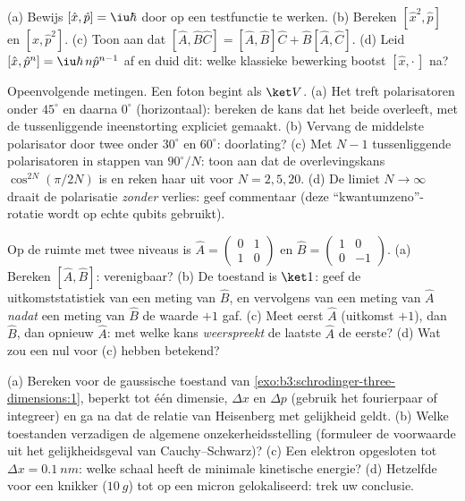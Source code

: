 \begin{exercise}[$\star$]\label{exo:b3:quantum-formalism:4}
(a) Bewijs $[\hat x, \hat p] = \iu\hbar$ door op een testfunctie te werken.
(b) Bereken $[\hat x^2, \hat p]$ en $[\hat x, \hat p^2]$. (c) Toon aan dat
$[\hat A, \hat B\hat C] = [\hat A, \hat B]\hat C + \hat B[\hat A,
\hat C]$. (d) Leid $[\hat x, \hat p^n] = \iu\hbar\,n\hat p^{n-1}$ af en
duid dit: welke klassieke bewerking bootst $[\hat x, \cdot\,]$ na?
\end{exercise}

\begin{exercise}[$\star\star$]\label{exo:b3:quantum-formalism:5}
Opeenvolgende metingen. Een foton begint als $\ket V$. (a) Het treft
polarisatoren onder $45^\circ$ en daarna $0^\circ$ (horizontaal): bereken
de kans dat het beide overleeft, met de tussenliggende ineenstorting
expliciet gemaakt. (b) Vervang de middelste polarisator door twee onder
$30^\circ$ en $60^\circ$: doorlating? (c) Met $N - 1$ tussenliggende
polarisatoren in stappen van $90^\circ/N$: toon aan dat de
overlevingskans $\cos^{2N}(\pi/2N)$ is en reken haar uit voor $N = 2, 5, 20$. (d) De limiet $N \to \infty$ draait de polarisatie \emph{zonder}
verlies: geef commentaar (deze ``kwantumzeno''-rotatie wordt op echte
qubits gebruikt).
\end{exercise}

\begin{exercise}[$\star\star$]\label{exo:b3:quantum-formalism:6}
Op de ruimte met twee niveaus is $\hat A = \begin{pmatrix}0&1\\1&0
\end{pmatrix}$ en $\hat B = \begin{pmatrix}1&0\\0&-1\end{pmatrix}$.
(a) Bereken $[\hat A, \hat B]$: verenigbaar? (b) De toestand is $\ket1$:
geef de uitkomststatistiek van een meting van $\hat B$, en vervolgens van
een meting van $\hat A$ \emph{nadat} een meting van $\hat B$ de waarde
$+1$ gaf. (c) Meet eerst $\hat A$ (uitkomst $+1$), dan $\hat B$, dan
opnieuw $\hat A$: met welke kans \emph{weerspreekt} de laatste $\hat A$
de eerste? (d) Wat zou een  nul voor (c) hebben
betekend?
\end{exercise}

\begin{exercise}[$\star\star$]\label{exo:b3:quantum-formalism:7}
(a) Bereken voor de gaussische toestand van
\cref{exo:b3:schrodinger-three-dimensions:1}, beperkt tot één dimensie,
$\Delta x$ en $\Delta p$ (gebruik het fourierpaar of integreer) en ga na
dat de relatie van Heisenberg met gelijkheid geldt. (b) Welke toestanden
verzadigen de algemene onzekerheidsstelling (formuleer de voorwaarde uit
het gelijkheidsgeval van Cauchy--Schwarz)? (c) Een elektron opgesloten tot
$\Delta x = \qty{0.1}{nm}$: welke schaal heeft de minimale kinetische
energie? (d) Hetzelfde voor een knikker ($\qty{10}{g}$) tot op een micron
gelokaliseerd: trek uw conclusie.
\end{exercise}

